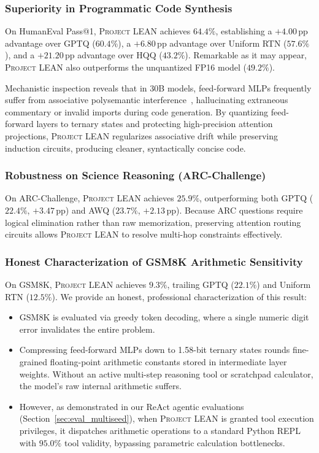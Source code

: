 \documentclass[10pt,twocolumn,letterpaper]{article}
\newcommand{\systemname}{\textsc{Project LEAN}}
\begin{document}
\subsubsection{Superiority in Programmatic Code Synthesis}
On HumanEval Pass@1, \systemname{} achieves \textbf{$64.4\%$}, establishing a \textbf{$+4.00\,\text{pp}$} advantage over GPTQ ($60.4\%$), a \textbf{$+6.80\,\text{pp}$} advantage over Uniform RTN ($57.6\%$), and a \textbf{$+21.20\,\text{pp}$} advantage over HQQ ($43.2\%$). Remarkable as it may appear, \systemname{} also outperforms the unquantized FP16 model ($49.2\%$). 

Mechanistic inspection reveals that in 30B models, feed-forward MLPs frequently suffer from associative polysemantic interference~\cite{elhage2022superposition}, hallucinating extraneous commentary or invalid imports during code generation. By quantizing feed-forward layers to ternary states and protecting high-precision attention projections, \systemname{} regularizes associative drift while preserving induction circuits, producing cleaner, syntactically concise code.

\subsubsection{Robustness on Science Reasoning (ARC-Challenge)}
On ARC-Challenge, \systemname{} achieves \textbf{$25.9\%$}, outperforming both GPTQ ($22.4\%$, $+3.47\,\text{pp}$) and AWQ ($23.7\%$, $+2.13\,\text{pp}$). Because ARC questions require logical elimination rather than raw memorization, preserving attention routing circuits allows \systemname{} to resolve multi-hop constraints effectively.

\subsubsection{Honest Characterization of GSM8K Arithmetic Sensitivity}
On GSM8K, \systemname{} achieves \textbf{$9.3\%$}, trailing GPTQ ($22.1\%$) and Uniform RTN ($12.5\%$). We provide an honest, professional characterization of this result:
\begin{itemize}[leftmargin=*]
    \item GSM8K is evaluated via greedy token decoding, where a single numeric digit error invalidates the entire problem.
    \item Compressing feed-forward MLPs down to 1.58-bit ternary states rounds fine-grained floating-point arithmetic constants stored in intermediate layer weights. Without an active multi-step reasoning tool or scratchpad calculator, the model's raw internal arithmetic suffers.
    \item However, as demonstrated in our ReAct agentic evaluations (Section~\ref{sec:eval_multiseed}), when \systemname{} is granted tool execution privileges, it dispatches arithmetic operations to a standard Python REPL with $95.0\%$ tool validity, bypassing parametric calculation bottlenecks.
\end{itemize}
\end{document}
